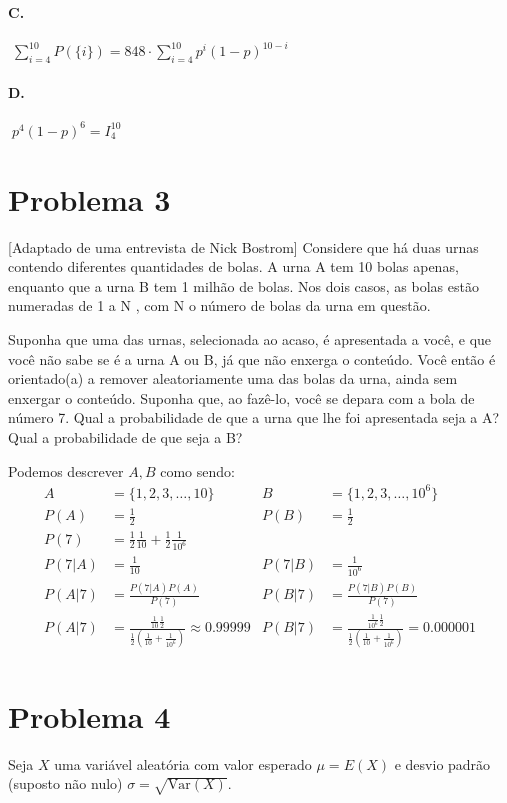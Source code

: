 \documentclass{article}
\begin{document}
\paragraph*{C.} $\; \sum_{i=4}^{10} P(\{i\}) = 848 \cdot \sum_{i=4}^{10}p^{i}(1-p)^{10-i}$

\paragraph*{D.} $\; p^{4}(1-p)^{6} = I^{10}_4$
\\[0.5em]
\section*{Problema 3}
[Adaptado de uma entrevista de Nick Bostrom] Considere que há duas urnas contendo diferentes
quantidades de bolas. A urna A tem 10 bolas apenas, enquanto que a urna B tem 1 milhão de bolas.
Nos dois casos, as bolas estão numeradas de 1 a N , com N o número de bolas da urna em questão.

Suponha que uma das urnas, selecionada ao acaso, é apresentada a você, e que você não sabe se é a
urna A ou B, já que não enxerga o conteúdo. Você então é orientado(a) a remover aleatoriamente uma
das bolas da urna, ainda sem enxergar o conteúdo. Suponha que, ao fazê-lo, você se depara com a
bola de número 7. Qual a probabilidade de que a urna que lhe foi apresentada seja a A? Qual a
probabilidade de que seja a B?

Podemos descrever $A, B$ como sendo:
\begin{align*}
    A &= \{1,2,3,\ldots,10\} & B &=  \{1,2,3,\ldots,10^{6}\} \\
    P(A) &= \frac{1}{2} & P(B) &= \frac{1}{2} \\
    P(7) &= \frac{1}{2}\frac{1}{10} + \frac{1}{2}\frac{1}{10^{6}} & \\
    P(7|A) &= \frac{1}{10} & P(7|B) &= \frac{1}{10^{6}} \\
    P(A|7) &= \frac{P(7|A)P(A)}{P(7)} & P(B|7) &= \frac{P(7|B)P(B)}{P(7)} \\
    P(A|7) &= \frac{\frac{1}{10}\frac{1}{2}}{\frac{1}{2}(\frac{1}{10}+\frac{1}{10^{6}})} \approx
    0.99999 & P(B|7) &=
    \frac{\frac{1}{10^{6}}\frac{1}{2}}{\frac{1}{2}(\frac{1}{10}+\frac{1}{10^{6}})} = 0.000001
    \\[-0.75em]
\end{align*}

\section*{Problema 4}
Seja $X$ uma variável aleatória com valor esperado $\mu = E(X)$ e desvio padrão (suposto não nulo)
$\sigma = \sqrt{\text{Var}(X)}$.
\end{document}

